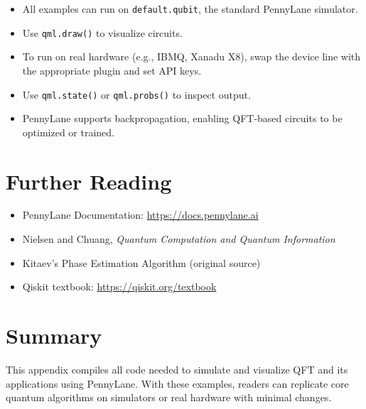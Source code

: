 \documentclass[12pt]{book}
\begin{document}
\begin{itemize}
\item All examples can run on \texttt{default.qubit}, the standard PennyLane simulator.
\item Use \texttt{qml.draw()} to visualize circuits.
\item To run on real hardware (e.g., IBMQ, Xanadu X8), swap the device line with the appropriate plugin and set API keys.
\item Use \texttt{qml.state()} or \texttt{qml.probs()} to inspect output.
\item PennyLane supports backpropagation, enabling QFT-based circuits to be optimized or trained.
\end{itemize}

\section{Further Reading}

\begin{itemize}
\item PennyLane Documentation: \url{https://docs.pennylane.ai}
\item Nielsen and Chuang, \emph{Quantum Computation and Quantum Information}
\item Kitaev's Phase Estimation Algorithm (original source)
\item Qiskit textbook: \url{https://qiskit.org/textbook}
\end{itemize}

\section{Summary}
This appendix compiles all code needed to simulate and visualize QFT and its applications using PennyLane. With these examples, readers can replicate core quantum algorithms on simulators or real hardware with minimal changes.
\end{document}
